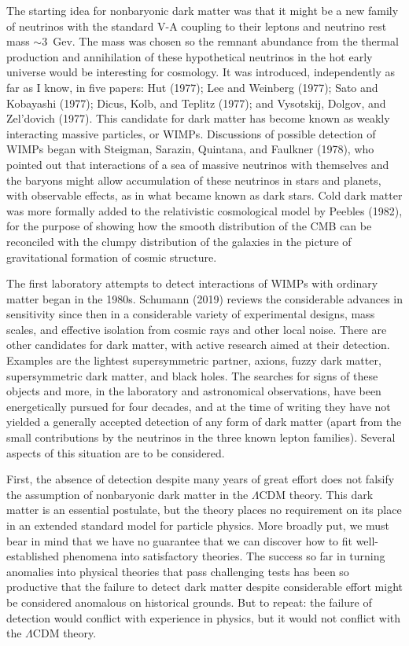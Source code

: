 \documentclass[fleqn,12pt]{article}
\begin{document}
The starting idea for nonbaryonic dark matter was that it might be a new family of neutrinos with the standard V-A coupling to their leptons and neutrino rest mass $\sim 3$~Gev. The mass was chosen so the remnant abundance from the thermal production and annihilation of these hypothetical neutrinos in the hot early universe would be interesting for cosmology. It was introduced, independently as far as I know, in five papers: Hut (1977); Lee and Weinberg (1977); Sato and Kobayashi (1977);  Dicus, Kolb, and Teplitz (1977);  and Vysotskij, Dolgov, and Zel'dovich (1977). This candidate for dark matter has become known as weakly interacting massive particles, or WIMPs. Discussions of possible detection of WIMPs began with Steigman, Sarazin, Quintana, and Faulkner (1978), who pointed out that interactions of a sea of massive neutrinos with themselves and the baryons might allow accumulation of these neutrinos in stars and planets, with observable effects, as in what became known as dark stars. Cold dark matter was more formally added to the relativistic cosmological model by Peebles (1982), for the purpose of showing how the smooth distribution of the CMB can be reconciled with the clumpy distribution of the galaxies in the picture of gravitational formation of cosmic structure. 

The first laboratory attempts to detect interactions of WIMPs with ordinary matter began in the 1980s. Schumann (2019) reviews the considerable advances in sensitivity since then in a considerable variety of experimental designs, mass scales, and effective isolation from cosmic rays and other local noise. There are other candidates for dark matter, with active research aimed at their detection. Examples are the lightest supersymmetric partner, axions, fuzzy dark matter, supersymmetric dark matter, and black holes. The searches for signs of these objects and more, in the laboratory and astronomical observations, have been energetically pursued for four decades, and at the time of writing they have not yielded a generally accepted detection of any form of dark matter (apart from the small contributions by the neutrinos in the three known lepton families). Several aspects of this situation are to be considered. 

First, the absence of detection despite many years of great effort does not falsify the assumption of nonbaryonic dark matter in the $\Lambda$CDM theory. This dark matter is an essential postulate, but the theory places no requirement on its place in an extended standard model for particle physics. More broadly put, we must bear in mind that we have no guarantee that we can discover how to fit well-established phenomena into satisfactory theories. The success so far in turning anomalies into physical theories that pass challenging tests has been so productive that the failure to detect dark matter despite considerable effort might be considered anomalous on historical grounds. But to repeat: the failure of detection would conflict with experience in physics, but it would not conflict with the $\Lambda$CDM theory. 
\end{document}
